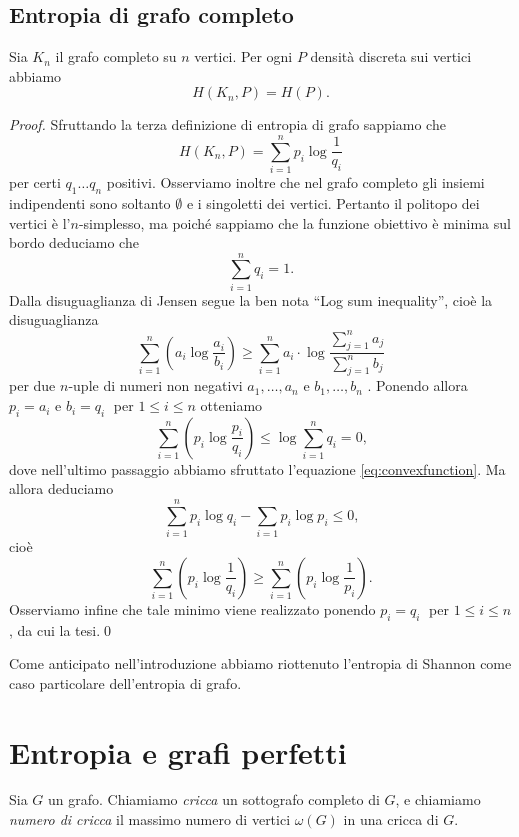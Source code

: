 \subsection{Entropia di grafo completo} 
\begin{proposition}
  Sia \(K_n\) il grafo completo su \(n\) vertici. Per ogni \(P\) densità discreta sui vertici abbiamo
  \[H(K_n,P)=H(P).\]
\end{proposition}
\begin{proof}
  Sfruttando la terza definizione di entropia di grafo sappiamo che
  \[H(K_n,P)=\sum_{i=1}^n p_i \log{\frac{1}{q_i}}\]
  per certi \(q_1\dots q_n\) positivi. Osserviamo inoltre che nel grafo completo gli insiemi indipendenti sono soltanto \(\emptyset\) e i singoletti dei vertici. Pertanto il politopo dei vertici è l'\(n\)-simplesso, ma poiché sappiamo che la funzione obiettivo è minima sul bordo deduciamo che
  \begin{equation} \label{eq:convexfunction}
    \sum_{i=1}^n q_i = 1.
  \end{equation}
  Dalla disuguaglianza di Jensen segue la ben nota ``Log sum inequality'', cioè la disuguaglianza
  \[
  \sum_{i=1}^n{\left(a_i\log{\frac{a_i}{b_i}}\right)} \ge \sum_{i=1}^n{a_i}\cdot\log{\frac{\sum_{j=1}^n{a_j}}{\sum_{j=1}^n{b_j}}}
  \]
  per due \(n\)-uple di numeri non negativi \(a_1,\dots,a_n\) e \(b_1,\dots,b_n\) \cite{Cover2006}.
  Ponendo allora \(p_i = a_i\) e \(b_i = q_i\;\) per \(1\le i\le n\) otteniamo
  \[
  \sum_{i=1}^n{\left(p_i\log{\frac{p_i}{q_i}}\right)} \le \log{\sum_{i=1}^n{q_i}} = 0\text{,}
  \]
  dove nell'ultimo passaggio abbiamo sfruttato l'equazione \eqref{eq:convexfunction}.
  Ma allora deduciamo
  \[
  \sum_{i=1}^n{p_i\log{q_i}} - \sum_{i=1}{p_i\log{p_i}} \le 0\text{,}
  \]
  cioè
  \[
  \sum_{i=1}^n{\left(p_i\log{\frac{1}{q_i}}\right)} \ge \sum_{i=1}^n{\left(p_i\log{\frac{1}{p_i}}\right)}\text{.}
  \]
  Osserviamo infine che tale minimo viene realizzato ponendo \(p_i = q_i\;\) per \(1\le i\le n\), da cui la tesi.\qed
\end{proof}
\begin{remark}
  Come anticipato nell'introduzione abbiamo riottenuto l'entropia di Shannon come caso particolare dell'entropia di grafo. 
\end{remark}

\section{Entropia e grafi perfetti} 
\begin{definition}
  Sia \(G\) un grafo. Chiamiamo \emph{cricca} un sottografo completo di \(G\), e chiamiamo \emph{numero di cricca} il massimo numero di vertici \(\omega(G)\) in una cricca di \(G\). 
\end{definition}

